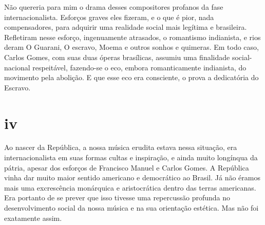Não quereria para mim o drama desses compositores profanos da fase
internacionalista. Esforços graves eles fizeram, e o que é pior, nada
compensadores, para adquirir uma realidade social mais legítima e
brasileira. Refletiram nesse esforço, ingenuamente atrasados, o
romantismo indianista, e rios deram O Guarani, O escravo, Moema e outros
sonhos e quimeras. Em todo caso, Carlos Gomes, com suas duas óperas
brasílicas, assumiu uma finalidade social-nacional respeitável,
fazendo-se o eco, embora romanticamente indianista, do movimento pela
abolição. E que esse eco era consciente, o prova a dedicatória do
Escravo.

\section*{iv}

Ao nascer da República, a nossa música erudita estava nessa situação,
era internacionalista em suas formas cultas e inspiração, e ainda muito
longínqua da pátria, apesar dos esforços de Francisco Manuel e Carlos
Gomes. A República vinha dar muito maior sentido americano e democrático
ao Brasil. Já não éramos mais uma excrescência monárquica e
aristocrática dentro das terras americanas. Era portanto de se prever
que isso tivesse uma repercussão profunda no desenvolvimento social da
nossa música e na sua orientação estética. Mas não foi exatamente assim.

